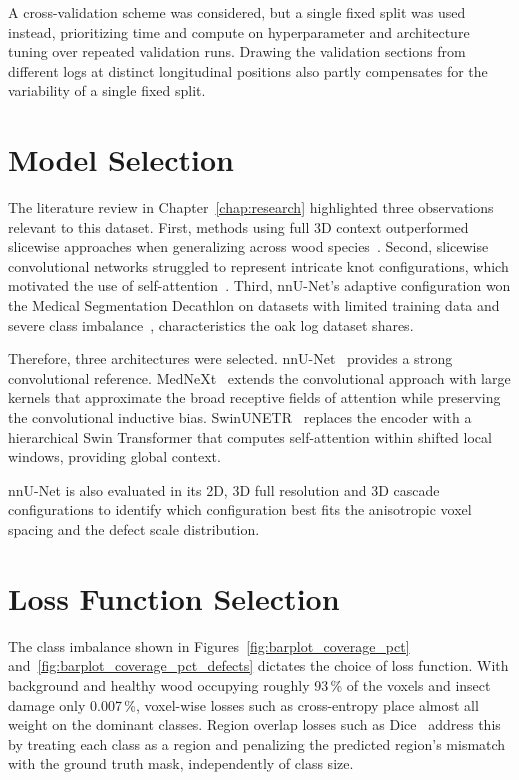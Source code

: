 A cross-validation scheme was considered, but a single fixed split was used instead, prioritizing time and compute on hyperparameter and architecture tuning over repeated validation runs. Drawing the validation sections from different logs at distinct longitudinal positions also partly compensates for the variability of a single fixed split.

\section{Model Selection}

The literature review in Chapter~\ref{chap:research} highlighted three observations relevant to this dataset. First, methods using full 3D context outperformed slicewise approaches when generalizing across wood species~\cite{Schmoldt_1998}. Second, slicewise convolutional networks struggled to represent intricate knot configurations, which motivated the use of self-attention~\cite{khazem2023deep}. Third, nnU-Net's adaptive configuration won the Medical Segmentation Decathlon on datasets with limited training data and severe class imbalance~\cite{isensee2021nnunet, antonelli2022msd}, characteristics the oak log dataset shares.

Therefore, three architectures were selected. nnU-Net~\cite{isensee2021nnunet} provides a strong convolutional reference. MedNeXt~\cite{roy2023mednext} extends the convolutional approach with large kernels that approximate the broad receptive fields of attention while preserving the convolutional inductive bias. SwinUNETR~\cite{hatamizadeh2022swinunetr} replaces the encoder with a hierarchical Swin Transformer that computes self-attention within shifted local windows, providing global context.

nnU-Net is also evaluated in its 2D, 3D full resolution and 3D cascade configurations to identify which configuration best fits the anisotropic voxel spacing and the defect scale distribution.

\section{Loss Function Selection}

The class imbalance shown in Figures~\ref{fig:barplot_coverage_pct} and~\ref{fig:barplot_coverage_pct_defects} dictates the choice of loss function. With background and healthy wood occupying roughly 93\,\% of the voxels and insect damage only 0.007\,\%, voxel-wise losses such as cross-entropy place almost all weight on the dominant classes. Region overlap losses such as Dice~\cite{milletari2016vnet} address this by treating each class as a region and penalizing the predicted region's mismatch with the ground truth mask, independently of class size.

